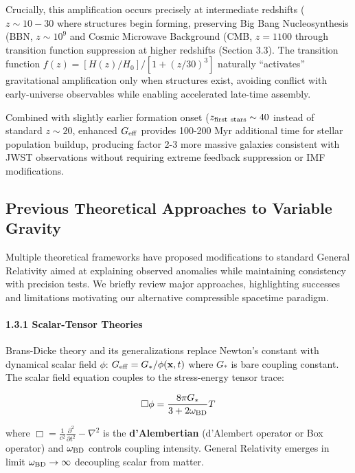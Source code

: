 \documentclass[11pt,a4paper]{article}
\begin{document}
Crucially, this amplification occurs precisely at intermediate redshifts
(\(z \sim 10-30\) where structures begin forming, preserving Big Bang
Nucleosynthesis (BBN, \(z \sim 10^9\) and Cosmic Microwave Background
(CMB, \(z = 1100\) through transition function suppression at higher
redshifts (Section 3.3). The transition function
\(f(z) = [H(z)/H_0]/[1+(z/30)^3]\) naturally ``activates'' gravitational
amplification only when structures exist, avoiding conflict with
early-universe observables while enabling accelerated late-time
assembly.

Combined with slightly earlier formation onset
(\(z_{\rm first~stars} \sim 40\) instead of standard \(z \sim 20\),
enhanced \(G_{\rm eff}\) provides 100-200 Myr additional time for
stellar population buildup, producing factor 2-3 more massive galaxies
consistent with JWST observations \cite{ref30} without requiring extreme feedback
suppression or IMF modifications.

\hypertarget{previous-theoretical-approaches-to-variable-gravity}{%
\subsection{Previous Theoretical Approaches to Variable
Gravity}\label{previous-theoretical-approaches-to-variable-gravity}}

Multiple theoretical frameworks have proposed modifications to standard
General Relativity aimed at explaining observed anomalies while
maintaining consistency with precision tests. We briefly review major
approaches, highlighting successes and limitations motivating our
alternative compressible spacetime paradigm.

\hypertarget{scalar-tensor-theories}{%
\paragraph{1.3.1 Scalar-Tensor Theories}\label{scalar-tensor-theories}}

Brans-Dicke theory \cite{Brans1961} and its generalizations replace Newton's
constant with dynamical scalar field \(\phi\):
\(G_{\rm eff} = G_*/\phi({\bf x},t)\) where \(G_*\) is bare coupling
constant. The scalar field equation couples to the stress-energy tensor
trace:

\[\Box\phi = \frac{8\pi G_*}{3 + 2\omega_{\rm BD}} T\]

where \(\Box = \frac{1}{c^2}\frac{\partial^2}{\partial t^2} - \nabla^2\)
is the \textbf{d'Alembertian} (d'Alembert operator or Box operator) and
\(\omega_{\rm BD}\) controls coupling intensity. General Relativity
emerges in limit \(\omega_{\rm BD} \to \infty\) decoupling scalar from
matter.
\end{document}
